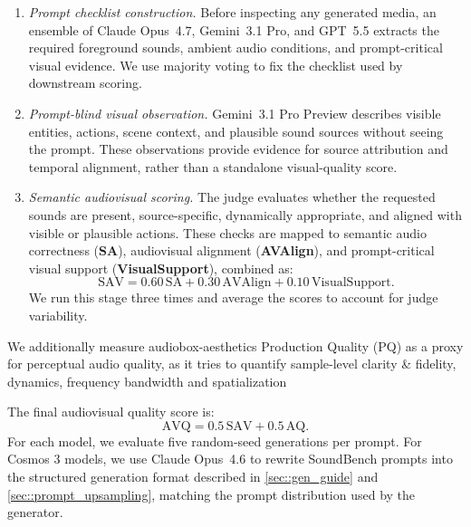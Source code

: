 \documentclass{llmxive}
\begin{document}
\begin{enumerate}
    \item \textit{Prompt checklist construction.} Before inspecting any generated media, an ensemble of Claude Opus~4.7, Gemini~3.1 Pro, and GPT~5.5 extracts the required foreground sounds, ambient audio conditions, and prompt-critical visual evidence. We use majority voting to fix the checklist used by downstream scoring.
    \item \textit{Prompt-blind visual observation.} Gemini~3.1 Pro Preview describes visible entities, actions, scene context, and plausible sound sources without seeing the prompt. These observations provide evidence for source attribution and temporal alignment, rather than a standalone visual-quality score.
    \item \textit{Semantic audiovisual scoring.} The judge evaluates whether the requested sounds are present, source-specific, dynamically appropriate, and aligned with visible or plausible actions. These checks are mapped to semantic audio correctness (\textbf{SA}), audiovisual alignment (\textbf{AVAlign}), and prompt-critical visual support (\textbf{VisualSupport}), combined as:
    \[
        \mathrm{SAV}=0.60\,\mathrm{SA}+0.30\,\mathrm{AVAlign}+0.10\,\mathrm{VisualSupport}.
    \]
    We run this stage three times and average the scores to account for judge variability.
\end{enumerate}

We additionally measure audiobox-aesthetics Production Quality (PQ) as a proxy for perceptual audio quality, as it tries to quantify sample-level clarity \& fidelity, dynamics, frequency bandwidth and spatialization~\citep{tjandra2025audioboxaesthetics}

The final audiovisual quality score is:
\[
    \mathrm{AVQ}=0.5\,\mathrm{SAV}+0.5\,\mathrm{AQ}.
\]
For each model, we evaluate five random-seed generations per prompt. For Cosmos 3 models, we use Claude Opus~4.6 to rewrite SoundBench prompts into the structured generation format described in \cref{sec::gen_guide} and \cref{sec::prompt_upsampling}, matching the prompt distribution used by the generator.
\end{document}

